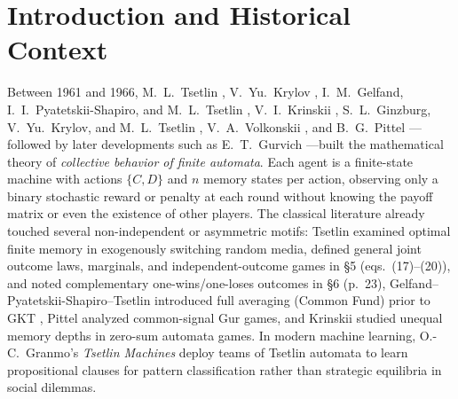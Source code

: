 \documentclass[11pt,reqno]{amsart}
\theoremstyle{definition}
\theoremstyle{remark}
\begin{document}
\begin{abstract}
Third, we establish a four-regime classification and $(0,-1/2,-3/2)$ power-law trichotomy for the stopped correlated quadrant walk, and connect the fair boundary ($P=1/2$, independent $DD$, $M/N\to\gamma\ge 1$) to interacting-game observables via exact Green identities $b=a^2 G_{oc}$, $d=b/G_{oo}$, $d=h a^2 V$. In the large-depth limit, $B/L$ converges to $\frac{5(4-\pi)}{4\log 3-\pi}\approx 3.4258$ (corner hits) and $D_0/D_{1/4}\approx 0.8565$ (immediate switches), yet converges to $1$ for zero-betrayal $DD\to CC$ breakouts, governed universally by $I(\gamma)=\frac{4kk'K(k)^2}{\pi}$ ($d\sim\frac{\pi I(\gamma)}{16N^2\log N}$, $b\sim\frac{I(\gamma)}{4N^2}$). Core algebraic and cancellation pillars are machine-verified in standalone Lean~4.
\end{abstract}

\maketitle

\section{Introduction and Historical Context}

Between 1961 and 1966, M.~L.~Tsetlin \cite{Tsetlin1961,Tsetlin1963}, V.~Yu.~Krylov \cite{Krylov1963}, I.~M.~Gelfand, I.~I.~Pyatetskii-Shapiro, and M.~L.~Tsetlin \cite{GPST1963}, V.~I.~Krinskii \cite{Krinskii1964,Krinskii1966}, S.~L.~Ginzburg, V.~Yu.~Krylov, and M.~L.~Tsetlin \cite{GKT1964}, V.~A.~Volkonskii \cite{Volkonskii1965}, and B.~G.~Pittel \cite{Pittel1965}---followed by later developments such as E.~T.~Gurvich \cite{Gurvich1975}---built the mathematical theory of \emph{collective behavior of finite automata}. Each agent is a finite-state machine with actions $\{C, D\}$ and $n$ memory states per action, observing only a binary stochastic reward or penalty at each round without knowing the payoff matrix or even the existence of other players. The classical literature already touched several non-independent or asymmetric motifs: Tsetlin \cite{Tsetlin1963} examined optimal finite memory in exogenously switching random media, defined general joint outcome laws, marginals, and independent-outcome games in \S 5 (eqs.~(17)--(20)), and noted complementary one-wins/one-loses outcomes in \S 6 (p.~23), Gelfand--Pyatetskii-Shapiro--Tsetlin \cite{GPST1963} introduced full averaging (Common Fund) prior to GKT \cite{GKT1964}, Pittel \cite{Pittel1965} analyzed common-signal Gur games, and Krinskii \cite{Krinskii1966} studied unequal memory depths in zero-sum automata games. In modern machine learning, O.-C.~Granmo's \emph{Tsetlin Machines} \cite{Granmo2018,Jiao2021,Belaid2023} deploy teams of Tsetlin automata to learn propositional clauses for pattern classification rather than strategic equilibria in social dilemmas.
\end{document}
